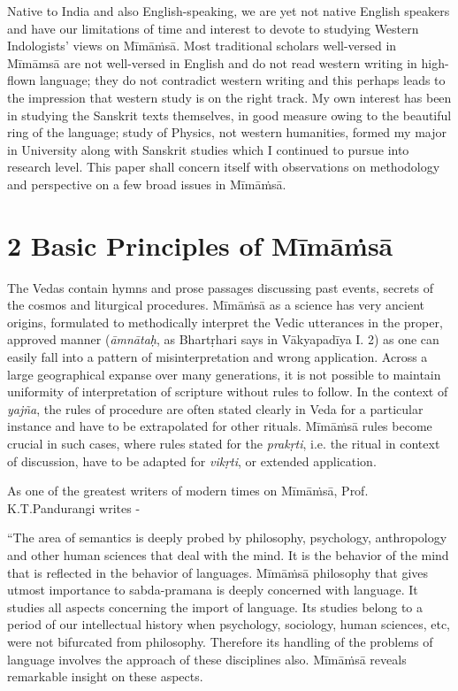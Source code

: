 Native to India and also English-speaking, we are yet not native English speakers and have our limitations of time and interest to devote to studying Western Indologists’ views on Mīmāṁsā. Most traditional scholars well-versed in Mīmāmsā are not well-versed in English and do not read western writing in high-flown language; they do not contradict western writing and this perhaps leads to the impression that western study is on the right track. My own interest has been in studying the Sanskrit texts themselves, in good measure owing to the beautiful ring of the language; study of Physics, not western humanities, formed my major in University along with Sanskrit studies which I continued to pursue into research level. This paper shall concern itself with observations on methodology and perspective on a few broad issues in Mīmāṁsā.

\vspace{-.3cm}

\section*{2 Basic Principles of Mīmāṁsā}

The Vedas contain hymns and prose passages discussing past events, secrets of the cosmos and liturgical procedures. Mīmāṁsā as a science has very ancient origins, formulated to methodically interpret the Vedic utterances in the proper, approved manner (\textit{āmnātaḥ}, as Bhartṛhari says in Vākyapadīya I. 2) as one can easily fall into a pattern of misinterpretation and wrong application. Across a large geographical expanse over many generations, it is not possible to maintain uniformity of interpretation of scripture without rules to follow. In the context of \textit{yajña}, the rules of procedure are often stated clearly in Veda for a particular instance and have to be extrapolated for other rituals. Mīmāṁsā rules become crucial in such cases, where rules stated for the \textit{prakṛti}, i.e. the ritual in context of discussion, have to be adapted for \textit{vikṛti}, or extended application.

As one of the greatest writers of modern times on Mīmāṁsā, Prof. K.T.Pandurangi writes -

\begin{myquote}
“The area of semantics is deeply probed by philosophy, psychology, anthropology and other human sciences that deal with the mind. It is the behavior of the mind that is reflected in the behavior of languages. Mīmāṁsā philosophy that gives utmost importance to sabda-pramana is deeply concerned with language. It studies all aspects concerning the import of language. Its studies belong to a period of our intellectual history when psychology, sociology, human sciences, etc, were not bifurcated from philosophy. Therefore its handling of the problems of language involves the approach of these disciplines also. Mīmāṁsā reveals remarkable insight on these aspects.
\end{myquote}

